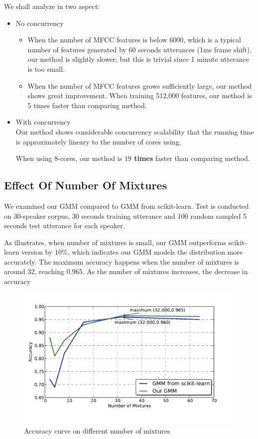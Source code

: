 We shall analyze in two aspect:
\begin{itemize}
	\item No concurrency
		\begin{itemize}
			\item When the number of MFCC features is below 6000, which is a typical
				number of features generated by 60 seconds utterances (1ms frame shift),
				our method is slightly slower; but this is trivial since
				1 minute utterance is too small.
			\item When the number of MFCC features grows sufficiently large, our method
				shows great improvement. When training 512,000 features, our method
				is 5 times faster than comparing method.
		\end{itemize}
	\item With concurrency \\
		Our method shows considerable concurrency scalability that the running time
		is approximately lineary to the number of cores using.

		When using 8-cores, our method is \textbf{$19$ times} faster than comparing
		method.
\end{itemize}


\subsection{Effect Of Number Of Mixtures}
We examined our GMM compared to GMM from scikit-learn.
Test is conducted on 30-speaker corpus, 30 seconds training utterance
and 100 random sampled 5 seconds test utterance for each speaker.

As  illustrates, when number of mixtures is small,
our GMM outperforms scikit-learn version by $10\%$, which indicates our
GMM models the distribution more accurately. The maximum accuracy
happens when the number of mixtures is around 32, reaching $0.965$. As
the number of mixtures increases, the decrease in accuracy

\begin{figure}
	\label{fig:mixture}
	\centering
	\includegraphics[width=\linewidth]{res/mixture-both.pdf}
	\caption{Accuracy curve on different number of mixtures}
\end{figure}

